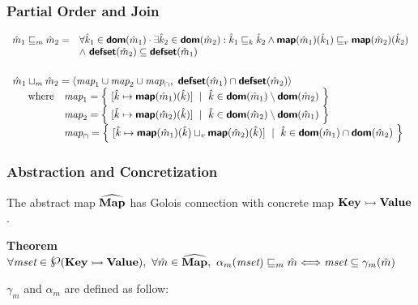 \subsubsection{Partial Order and Join}
$\begin{array}{rl}
\hat{m}_1 \sqsubseteq_m \hat{m}_2 = & 
\forall \hat{k}_1 \in \textsf{\textbf{dom}}(\hat{m}_1) \cdot 
\exists \hat{k}_2 \in \textsf{\textbf{dom}}(\hat{m}_2) :
\hat{k}_1 \sqsubseteq_k \hat{k}_2
\land \textsf{\textbf{map}}(\hat{m}_1)(\hat{k}_1) \sqsubseteq_v \textsf{\textbf{map}}(\hat{m}_2)(\hat{k}_2) \\
& \land\ \textsf{\textbf{defset}}(\hat{m}_2) \subseteq \textsf{\textbf{defset}}(\hat{m}_1) \\
\end{array}$\\\\
$\begin{array}{l}
\hat{m}_1 \sqcup_m \hat{m}_2 =
\langle \emph{map}_1 \cup \emph{map}_2 \cup \emph{map}_{\cap},\
\textsf{\textbf{defset}}(\hat{m}_1) \cap \textsf{\textbf{defset}}(\hat{m}_2) \rangle \\
\quad \begin{array}{rl} \textrm{where} 
& \emph{map}_1 = \left \{~ [ \hat{k} \mapsto \textsf{\textbf{map}}(\hat{m}_1)(\hat{k}) ] ~\mid~
\hat{k} \in \textsf{\textbf{dom}}(\hat{m}_1) 
\setminus \textsf{\textbf{dom}}(\hat{m}_2) ~\right \} \\
& \emph{map}_2 = \left \{~ [ \hat{k} \mapsto \textsf{\textbf{map}}(\hat{m}_2)(\hat{k}) ] ~\mid~
\hat{k} \in \textsf{\textbf{dom}}(\hat{m}_2)
\setminus \textsf{\textbf{dom}}(\hat{m}_1) ~\right \} \\
& \emph{map}_{\cap} = \left \{~ [ \hat{k} \mapsto 
\textsf{\textbf{map}}(\hat{m}_1)(\hat{k}) \sqcup_v \textsf{\textbf{map}}(\hat{m}_2)(\hat{k}) ] ~\mid~
\hat{k} \in \textsf{\textbf{dom}}(\hat{m}_1) 
\cap \textsf{\textbf{dom}}(\hat{m}_2) ~\right \} \\
\end{array} \\
\end{array}$

\subsubsection{Abstraction and Concretization} \label{sec:galois}
The abstract map $\widehat{\textbf{Map}}$ has Golois connection with concrete map $\textbf{Key} \rightarrowtail \textbf{Value}$.
\begin{center}
\textbf{Theorem }
$\forall \emph{mset} \in \poset(\CMap), ~ 
\forall \hat{m} \in \AMap, ~
\alpha_m(\emph{mset}) \po_m \hat{m}
\Longleftrightarrow
\emph{mset} \subseteq \gamma_m(\hat{m})$
\end{center}
$\gamma_m$ and $\alpha_m$ are defined as follow: \\


